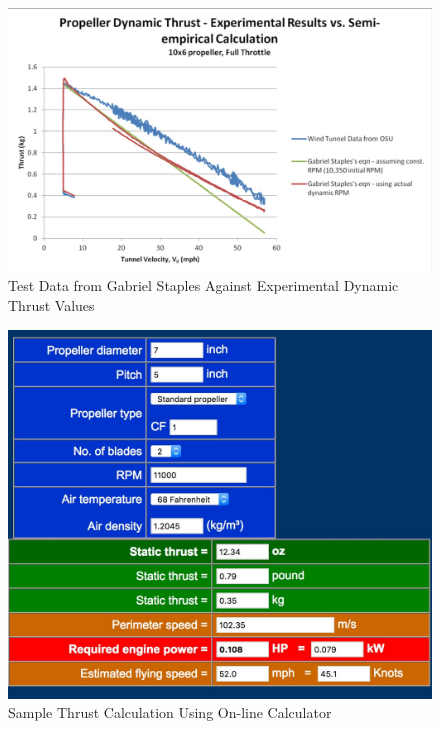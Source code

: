 \documentclass[../main.tex]{subfiles}
\begin{document}
\begin{figure}[H]
	\centering
	\includegraphics[width=1\textwidth]{img/thrust/thrustdynamictest.jpg}
	\caption{Test Data from Gabriel Staples Against Experimental Dynamic Thrust Values \cite{thrusteq}}
	\label{fig:thrustdynamictest}
\end{figure}

\begin{figure}[H]
	\centering
	\includegraphics[width=1\textwidth]{img/thrust/thrustcalc.jpg}
	\caption{Sample Thrust Calculation Using On-line Calculator \cite{thrustcalc}}
	\label{fig:thrustcalc}
\end{figure}

\pagebreak
\end{document}
